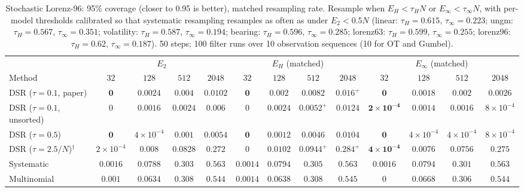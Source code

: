 \begin{table}[ht]
\centering
\small
\caption{Stochastic Lorenz-96: 95\% coverage (closer to 0.95 is better), matched resampling rate. Resample when $E_H<\tau_HN$ or $E_\infty<\tau_\infty N$, with per-model thresholds calibrated so that systematic resampling resamples as often as under $E_2<0.5N$ (linear: $\tau_H{=}0.615$, $\tau_\infty{=}0.223$; ungm: $\tau_H{=}0.567$, $\tau_\infty{=}0.351$; volatility: $\tau_H{=}0.587$, $\tau_\infty{=}0.194$; bearing: $\tau_H{=}0.596$, $\tau_\infty{=}0.285$; lorenz63: $\tau_H{=}0.599$, $\tau_\infty{=}0.255$; lorenz96: $\tau_H{=}0.62$, $\tau_\infty{=}0.187$). 50 steps; 100 filter runs over 10 observation sequences (10 for OT and Gumbel).}
\label{tab:trigger-matched-lorenz96-coverage95}
\begin{adjustbox}{max width=\linewidth}
\begin{tabular}{lcccc|cccc|cccc}
\toprule
 & \multicolumn{4}{c}{$E_2$} & \multicolumn{4}{c}{$E_H$ (matched)} & \multicolumn{4}{c}{$E_\infty$ (matched)} \\
\cmidrule(lr){2-5} \cmidrule(lr){6-9} \cmidrule(lr){10-13}
Method & $32$ & $128$ & $512$ & $2048$ & $32$ & $128$ & $512$ & $2048$ & $32$ & $128$ & $512$ & $2048$ \\
\midrule
DSR ($\tau{=}0.1$, paper) & $\mathbf{0}$ & $\mathbf{0.0024}$ & $0.004$ & $0.0102$ & $\mathbf{0}$ & $0.002$ & $\mathbf{0.0082}$ & $\mathbf{0.016}^{+}$ & $\mathbf{0}$ & $0.0018$ & $0.002$ & $0.0026$ \\
DSR ($\tau{=}0.1$, unsorted) & $0$ & $0.0016$ & $0.0024$ & $0.006$ & $0$ & $\mathbf{0.0024}$ & $\mathbf{0.0052}^{+}$ & $\mathbf{0.0124}$ & $\mathbf{2\times10^{-4}}$ & $0.0014$ & $0.0016$ & $8\times10^{-4}$ \\
DSR ($\tau{=}0.5$) & $\mathbf{0}$ & $4\times10^{-4}$ & $0.001$ & $0.0054$ & $\mathbf{0}$ & $\mathbf{0.0012}$ & $\mathbf{0.0046}$ & $\mathbf{0.0104}$ & $\mathbf{0}$ & $4\times10^{-4}$ & $4\times10^{-4}$ & $8\times10^{-4}$ \\
DSR ($\tau{=}2.5/N$)$^\dagger$ & $2\times10^{-4}$ & $0.008$ & $0.0828$ & $0.272$ & $0$ & $\mathbf{0.0102}$ & $\mathbf{0.0944}^{+}$ & $\mathbf{0.284}^{+}$ & $\mathbf{4\times10^{-4}}$ & $0.0076$ & $0.0756$ & $0.275$ \\
\midrule
Systematic & $\mathbf{0.0016}$ & $0.0788$ & $0.303$ & $0.563$ & $0.0014$ & $\mathbf{0.0794}$ & $\mathbf{0.305}$ & $\mathbf{0.563}$ & $\mathbf{0.0016}$ & $\mathbf{0.0794}$ & $0.301$ & $0.563$ \\
Multinomial & $0.001$ & $0.0634$ & $\mathbf{0.308}$ & $0.544$ & $\mathbf{0.0014}$ & $0.0638$ & $\mathbf{0.308}$ & $\mathbf{0.545}$ & $0$ & $\mathbf{0.0668}$ & $0.306$ & $0.544$ \\

\end{tabular}
\end{adjustbox}
\end{table}
